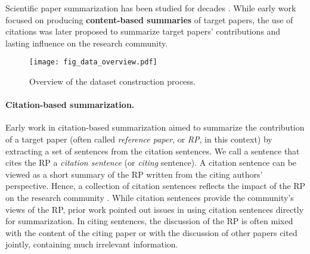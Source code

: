 \documentclass[letterpaper]{article} \usepackage{aaai19}  \usepackage{times}  \usepackage{helvet}  \usepackage{courier}  \usepackage{url}
\begin{document}
Scientific paper summarization has been studied for decades
\cite{Paice:1980:AGL:636669.636680,Elkiss:2008:BME:1331122.1331127,lloret2013compendium,jaidka2016overview,parveen2016generating}.
While early work \cite{luhn1958automatic,Paice:1980:AGL:636669.636680,Paice:1993:IIC:160688.160696} focused on producing \textbf{content-based summaries} of target papers,
the use of citations was later proposed to summarize
target papers' contributions and lasting influence on the research community.



\begin{figure*}[!th]
    \vspace{0mm}\hspace{-1.5mm}
    \centering
    \texttt{[image: fig\_data\_overview.pdf]}\vspace{-2mm}
    \caption{Overview of the dataset construction process.
    }
\label{fig:data_overview}
\vspace{-3mm}
\end{figure*}


\paragraph{Citation-based summarization.}
Early work in citation-based summarization
\cite{nakov2004citances,Elkiss:2008:BME:1331122.1331127,qazvinian2008scientific,abuJbara&Radev11a} aimed to summarize the contribution of a target paper (often called {\it reference paper}, or {\it RP}, in this context)
by extracting a set of sentences from the citation sentences.
We call a sentence that cites the RP a {\it citation sentence} (or
{\it citing} sentence).
A citation sentence can be viewed as a short summary of the RP written from the citing authors' perspective.
Hence, a collection of citation sentences reflects the impact of the RP on the research community \cite{Elkiss:2008:BME:1331122.1331127}.
While citation sentences provide
the community's views of
the RP, prior work \cite{siddharthan2007whose,mei-zhai:2008:ACLMain} pointed out issues in using citation sentences directly for summarization.
In citing sentences, the discussion of the RP is often mixed with the content of the citing paper or with the discussion of other papers cited jointly, containing much irrelevant information.
\end{document}
